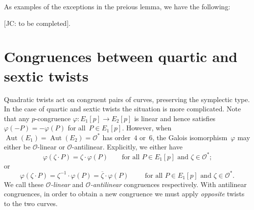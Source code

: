 \documentclass[12pt, reqno]{amsart}
\newcommand{\calO}{\mathcal{O}}
\DeclareMathOperator{\Aut}{Aut}
\numberwithin{equation}{section}
\theoremstyle{definition}
\theoremstyle{remark}
\newcommand{\jc}[1]{{\color{darkgreen} \textsf{[JC: #1]}}}
\begin{document}
As examples of the exceptions in the preious lemma, we have the
following:

\jc{to be completed}.

\section{Congruences between quartic and sextic twists}\label{S:cong-twist-46}

Quadratic twists act on congruent pairs of curves, preserving the
symplectic type.  In the case of quartic and sextic twists the
situation is more complicated.  Note that any $p$-congruence
$\varphi:E_1[p]\to E_2[p]$ is linear and hence satisfies
$\varphi(-P)=-\varphi(P)$ for all~$P\in E_1[p]$.  However, when
$\Aut(E_1)=\Aut(E_2)=\calO^*$ has order~$4$ or~$6$, the Galois
isomorphism~$\varphi$ may either be $\calO$-linear or
$\calO$-antilinear.  Explicitly, we either have
\begin{equation}\label{E:forward-congruence}
\varphi(\zeta\cdot P) = \zeta\cdot\varphi(P)
\qquad\text{for all~$P\in  E_1[p]$ and~$\zeta\in\calO^*$;}
\end{equation}
or
\begin{equation}\label{E:backward-congruence}
\varphi(\zeta\cdot P) = \zeta^{-1}\cdot\varphi(P) = \overline\zeta\cdot\varphi(P)
\qquad\text{ for all~$P\in E_1[p]$ and~$\zeta\in\calO^*$.}
\end{equation}
We call these \emph{$\calO$-linear} and \emph{$\calO$-antilinear}
congruences respectively.  With antilinear congruences, in order to
obtain a new congruence we must apply \emph{opposite} twists to the
two curves.
\end{document}
